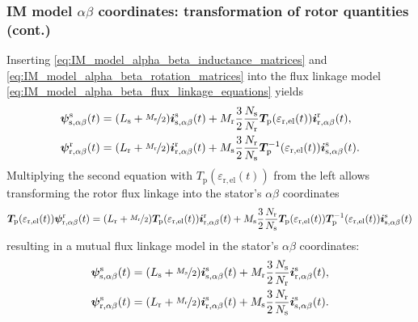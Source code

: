 \begin{frame}
	\frametitle{IM model $\alpha\beta$ coordinates: transformation of rotor quantities (cont.)}
	Inserting \eqref{eq:IM_model_alpha_beta_inductance_matrices} and \eqref{eq:IM_model_alpha_beta_rotation_matrices} into the flux linkage model \eqref{eq:IM_model_alpha_beta_flux_linkage_equations} yields
	\begin{equation}
		\begin{split}
			\bm{\psi}^\mathrm{s}_\mathrm{s,\alpha\beta}(t) & = (L_\mathrm{s} +\nicefrac{M_\mathrm{s}}{2}) \bm{i}^\mathrm{s}_{\mathrm{s},\alpha\beta}(t) +  M_{\mathrm{r}}\frac{3}{2}\frac{N_\mathrm{s}}{N_\mathrm{r}} \bm{T}_\mathrm{p}(\varepsilon_\mathrm{r,el}(t))\bm{i}^\mathrm{r}_{\mathrm{r},\alpha\beta}(t),      \\
			\bm{\psi}^\mathrm{r}_\mathrm{r,\alpha\beta}(t) & = (L_\mathrm{r} +\nicefrac{M_\mathrm{r}}{2}) \bm{i}^\mathrm{r}_{\mathrm{r},\alpha\beta}(t) +  M_{\mathrm{s}}\frac{3}{2}\frac{N_\mathrm{r}}{N_\mathrm{s}} \bm{T}_\mathrm{p}^{-1}(\varepsilon_\mathrm{r,el}(t))\bm{i}^\mathrm{s}_{\mathrm{s},\alpha\beta}(t).
		\end{split}
	\end{equation}
	\pause
	Multiplying the second equation with $T_\mathrm{p}(\varepsilon_\mathrm{r,el}(t))$ from the left allows transforming the rotor flux linkage into the stator's $\alpha\beta$ coordinates
	\begin{equation*}
		\bm{T}_\mathrm{p}(\varepsilon_\mathrm{r,el}(t))\bm{\psi}^\mathrm{r}_\mathrm{r,\alpha\beta}(t)  = (L_\mathrm{r} +\nicefrac{M_\mathrm{r}}{2}) \bm{T}_\mathrm{p}(\varepsilon_\mathrm{r,el}(t))\bm{i}^\mathrm{r}_{\mathrm{r},\alpha\beta}(t) +  M_{\mathrm{s}}\frac{3}{2}\frac{N_\mathrm{r}}{N_\mathrm{s}} \bm{T}_\mathrm{p}(\varepsilon_\mathrm{r,el}(t))\bm{T}_\mathrm{p}^{-1}(\varepsilon_\mathrm{r,el}(t))\bm{i}^\mathrm{s}_{\mathrm{s},\alpha\beta}(t)
	\end{equation*}
	\pause
	resulting in a mutual flux linkage model in the stator's $\alpha\beta$ coordinates:
	\begin{equation}
		\begin{split}
			\bm{\psi}^\mathrm{s}_\mathrm{s,\alpha\beta}(t) & = (L_\mathrm{s} +\nicefrac{M_\mathrm{s}}{2}) \bm{i}^\mathrm{s}_{\mathrm{s},\alpha\beta}(t) +  M_{\mathrm{r}}\frac{3}{2}\frac{N_\mathrm{s}}{N_\mathrm{r}} \bm{i}^\mathrm{s}_{\mathrm{r},\alpha\beta}(t), \\
			\bm{\psi}^\mathrm{s}_\mathrm{r,\alpha\beta}(t) & = (L_\mathrm{r} +\nicefrac{M_\mathrm{r}}{2}) \bm{i}^\mathrm{s}_{\mathrm{r},\alpha\beta}(t) +  M_{\mathrm{s}}\frac{3}{2}\frac{N_\mathrm{r}}{N_\mathrm{s}} \bm{i}^\mathrm{s}_{\mathrm{s},\alpha\beta}(t).
		\end{split}
		\label{eq:IM_model_alpha_beta_flux_linkage_equations_stator_oriented}
	\end{equation}
\end{frame}

